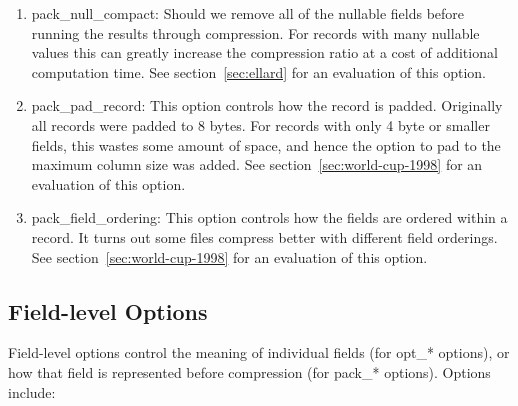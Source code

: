 \begin{enumerate}

\item pack\_null\_compact: Should we remove all of the nullable fields
before running the results through compression.  For records with many
nullable values this can greatly increase the compression ratio at a
cost of additional computation time.  See section~\ref{sec:ellard} for
an evaluation of this option.

\item pack\_pad\_record: This option controls how the record is
padded.  Originally all records were padded to 8 bytes.  For records
with only 4 byte or smaller fields, this wastes some amount of space,
and hence the option to pad to the maximum column size was added.  See
section~\ref{sec:world-cup-1998} for an evaluation of this option.

\item pack\_field\_ordering: This option controls how the fields are
ordered within a record.  It turns out some files compress better with
different field orderings.  See section~\ref{sec:world-cup-1998} for
an evaluation of this option.

\end{enumerate}

\subsection{Field-level Options}
\label{sec:design:field-options}

Field-level options control the meaning of individual fields (for
opt\_* options), or how that field is represented before compression
(for pack\_* options).  Options include:


